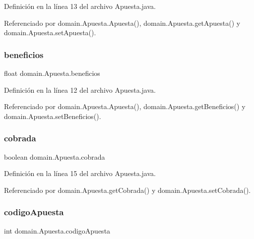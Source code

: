 Definición en la línea 13 del archivo Apuesta.\+java.



Referenciado por domain.\+Apuesta.\+Apuesta(), domain.\+Apuesta.\+get\+Apuesta() y domain.\+Apuesta.\+set\+Apuesta().

\mbox{\label{classdomain_1_1Apuesta_acec50d5cb60237c9965be9f66d36e041}} 
\subsubsection{\texorpdfstring{beneficios}{beneficios}}
{\footnotesize\ttfamily float domain.\+Apuesta.\+beneficios\hspace{0.3cm}{\ttfamily [private]}}



Definición en la línea 12 del archivo Apuesta.\+java.



Referenciado por domain.\+Apuesta.\+Apuesta(), domain.\+Apuesta.\+get\+Beneficios() y domain.\+Apuesta.\+set\+Beneficios().

\mbox{\label{classdomain_1_1Apuesta_a32769c4fa66a117a3728faf31056a7a9}} 
\subsubsection{\texorpdfstring{cobrada}{cobrada}}
{\footnotesize\ttfamily boolean domain.\+Apuesta.\+cobrada\hspace{0.3cm}{\ttfamily [private]}}



Definición en la línea 15 del archivo Apuesta.\+java.



Referenciado por domain.\+Apuesta.\+get\+Cobrada() y domain.\+Apuesta.\+set\+Cobrada().

\mbox{\label{classdomain_1_1Apuesta_afa9c90fb9ef5b0e4e674c14e8897f73c}} 
\subsubsection{\texorpdfstring{codigoApuesta}{codigoApuesta}}
{\footnotesize\ttfamily int domain.\+Apuesta.\+codigo\+Apuesta\hspace{0.3cm}{\ttfamily [private]}}



